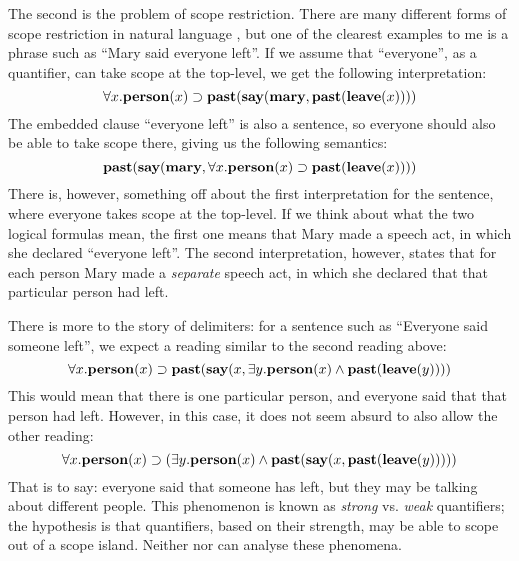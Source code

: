 The second is the problem of scope restriction. There are many
different forms of scope restriction in natural language
\citep[see][]{szabolcsi2000}, but one of the clearest examples to me
is a phrase such as ``Mary said everyone left''. If we assume that
``everyone'', as a quantifier, can take scope at the top-level, we get
the following interpretation:
\[
  \forall{x}.\mathbf{person}(x)\supset\mathbf{past}(\mathbf{say}(\mathbf{mary},\mathbf{past}(\mathbf{leave}(x))))
\]
The embedded clause ``everyone left'' is also a sentence, so everyone
should also be able to take scope there, giving us the following
semantics:
\[
  \mathbf{past}(\mathbf{say}(\mathbf{mary},\forall{x}.\mathbf{person}(x)\supset\mathbf{past}(\mathbf{leave}(x))))
\]
There is, however, something off about the first interpretation for
the sentence, where everyone takes scope at the top-level. If we think
about what the two logical formulas mean, the first one means that
Mary made a speech act, in which she declared ``everyone left''. The
second interpretation, however, states that for each person Mary made
a \emph{separate} speech act, in which she declared that that
particular person had left.

There is more to the story of delimiters: for a sentence such as
``Everyone said someone left'', we expect a reading similar to the
second reading above:
\[
  \forall{x}.\mathbf{person}(x)\supset\mathbf{past}(\mathbf{say}(x,\exists{y}.\mathbf{person}(x)\wedge\mathbf{past}(\mathbf{leave}(y))))
\]
This would mean that there is one particular person, and everyone said
that that person had left. However, in this case, it does not seem
absurd to also allow the other reading:
\[
  \forall{x}.\mathbf{person}(x)\supset(\exists{y}.\mathbf{person}(x)\wedge\mathbf{past}(\mathbf{say}(x,\mathbf{past}(\mathbf{leave}(y)))))
\]
That is to say: everyone said that someone has left, but they may be
talking about different people.
This phenomenon is known as \emph{strong} vs. \emph{weak} quantifiers;
the hypothesis is that quantifiers, based on their strength, may be
able to scope out of a scope island. Neither
\citet{barker2002,barker2004} nor \citet{moortgat2012} can analyse
these phenomena.



